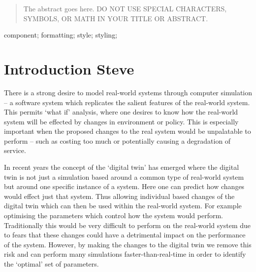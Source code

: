 \documentclass[10pt, conference, compsocconf]{IEEEtran}
\begin{document}




\maketitle

\begin{abstract}
The abstract goes here. DO NOT USE SPECIAL CHARACTERS, SYMBOLS, OR MATH IN YOUR TITLE OR ABSTRACT.

\end{abstract}

\begin{IEEEkeywords}
component; formatting; style; styling;

\end{IEEEkeywords}


%
\IEEEpeerreviewmaketitle


\section{Introduction {\color{red}Steve}}
There is a strong desire to model real-world systems through computer simulation -- a software system which replicates the salient features of the real-world system. This permits `what if' analysis, where one desires to know how the real-world system will be effected by changes in environment or policy. This is especially important when the proposed changes to the real system would be unpalatable to perform -- such as costing too much or potentially causing a degradation of service. 

In recent years the concept of the `digital twin' has emerged where the digital twin is not just a simulation based around a common type of real-world system but around one specific instance of a system. Here one can predict how changes would effect just that system. Thus allowing individual based changes of the digital twin which can then be used within the real-world system. For example optimising the parameters which control how the system would perform. Traditionally this would be very difficult to perform on the real-world system due to fears that these changes could have a detrimental impact on the performance of the system. However, by making the changes to the digital twin we remove this risk and can perform many simulations faster-than-real-time in order to identify the `optimal' set of parameters.
\end{document}
